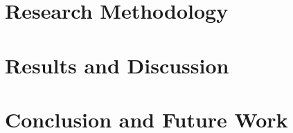 \documentclass[Times,12pt,oneside,openany,print,index]{report}
\begin{document}
\chapter{Research Methodology}


\chapter{Results and Discussion}


\chapter{Conclusion and Future Work}


% 

% 

\printbibliography %

% 

% 
\end{document}

